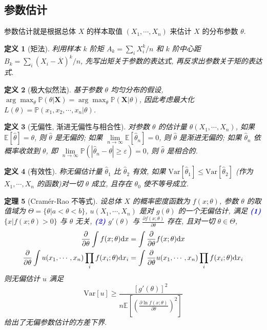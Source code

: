 \documentclass[8pt]{article}
\theoremstyle{compact}
\newtheorem{theorem}{定理}
\newtheorem{definition}[theorem]{定义}
\def\num#1{\textnormal{\textbf{\mbox{\textcolor{blue}{(#1)}}}}}
\def\le{\leqslant}
\def\ge{\geqslant}
\def\P#1{\mathbb{P}\left({#1}\right)}
\def\E#1{\mathbb{E}\left[{#1}\right]}
\def\Var#1{\text{Var}\left[{#1}\right]}
\begin{document}
\subsection{参数估计}
参数估计就是根据总体 $X$ 的样本取值 $(X_1, \cdots, X_n)$ 来估计 $X$ 的分布参数 $\theta$.
\begin{definition}[矩法]
	利用样本 $k$ 阶矩 $A_k = \sum_i X_i^k / n$ 和 $k$ 阶中心距 $B_k = \sum_i (X_i - \overline{X})^k / n$, 先写出矩关于参数的表达式, 再反求出参数关于矩的表达式.
\end{definition}
\begin{definition}[极大似然法]
	基于参数 $\theta$ 均匀分布的假设, $\arg\max_{\theta}\P{\theta | \mathbf X} = \arg\max_{\theta}\P{\mathbf X | \theta}$, 因此考虑最大化 $L(\theta) = \P{x_1, x_2, \cdots, x_n | \theta}$.
\end{definition}
\begin{definition}[无偏性, 渐进无偏性与相合性]
	对参数 $\theta$ 的估计量 $\hat\theta(X_1, \cdots, X_n)$, 如果 $\E{\hat\theta} = \theta$, 则 $\hat\theta$ 是无偏的; 如果 $\lim\limits_{n \to \infty}\E{\hat\theta_n} = 0$, 则 $\hat\theta$ 是渐进无偏的; 如果 $\hat\theta_n$ 依概率收敛到 $\theta$, 即 $\lim\limits_{n \to \infty} \P{|\hat\theta_n - \theta| \ge \varepsilon} = 0$, 则 $\hat{\theta}$ 是相合的.
\end{definition}
\begin{definition}[有效性]
	称无偏估计量 $\hat\theta_1$ 比 $\hat\theta_2$ 有效, 如果 $\Var{\hat\theta_1} \le \Var{\hat\theta_2}$ (作为 $X_1, \cdots, X_n$ 的函数)对一切 $\theta$ 成立, 且存在 $\theta_0$ 使不等号成立.
\end{definition}
\begin{theorem}[Cram\'er-Rao 不等式]
	设总体 $X$ 的概率密度函数为 $f(x; \theta)$, 参数 $\theta$ 的取值域为 $\Theta = \{\theta | a < \theta < b\}$, $u(X_1, \cdots, X_n)$ 是对 $g(\theta)$ 的一个无偏估计, 满足 \num{1} $\{x | f(x; \theta) > 0\}$ 与 $\theta$ 无关, \num{2} $g'(\theta)$ 与 $\frac{\partial f(x; \theta)}{\partial \theta}$ 存在, 且对一切 $\theta \in \Theta$, \begin{align*}\frac{\partial}{\partial\theta}\int f(x;\theta)\text dx &= \int\frac{\partial}{\partial\theta} f(x;\theta)\text dx \\ \frac{\partial}{\partial\theta}\int u(x_1, \cdots, x_n)\prod_i f(x_i; \theta)\text dx_i &= \int\frac{\partial}{\partial\theta} u(x_1, \cdots, x_n)\prod_i f(x_i; \theta)\text dx_i\end{align*} 则无偏估计 $u$ 满足 $$\Var{u} \ge \frac{[g'(\theta)]^2}{n\E{\left(\frac{\partial \ln f(x; \theta)}{\partial \theta}\right)^2}}$$ 给出了无偏参数估计的方差下界.
\end{theorem}
\end{document}
